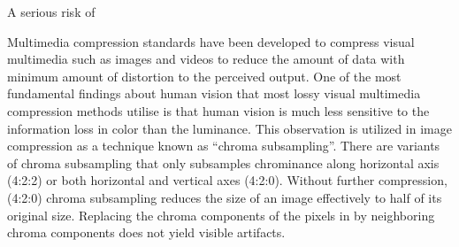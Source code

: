A serious risk of 


Multimedia compression standards have been developed to compress visual multimedia such as images and videos to reduce the amount of data with minimum amount of distortion to the perceived output. One of the most fundamental findings about human vision that most lossy visual multimedia compression methods utilise is that human vision is much less sensitive to the information loss in color than the luminance.
This observation is utilized in image compression as a technique known as ``chroma subsampling''. There are variants of chroma subsampling that only subsamples chrominance along horizontal axis (4:2:2) or both horizontal and vertical axes (4:2:0). Without further compression, (4:2:0) chroma subsampling reduces the size of an image effectively to half of its original size. Replacing the chroma components of the pixels in by neighboring chroma components does not yield visible artifacts.
